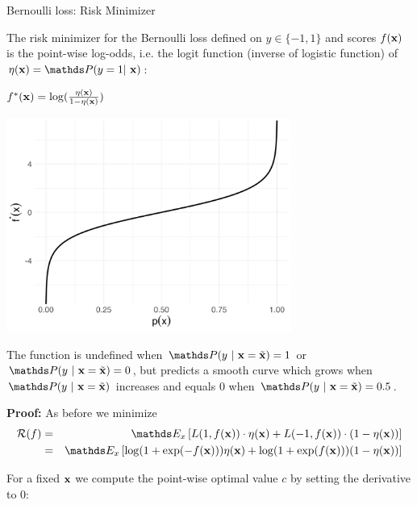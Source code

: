 \documentclass[11pt,compress,t,notes=noshow, xcolor=table]{beamer}
\begin{document}
\begin{vbframe}{Bernoulli loss: Risk Minimizer}
\begin{footnotesize}
\end{footnotesize}

\framebreak 

The risk minimizer for the Bernoulli loss defined on $y \in \{-1, 1\}$ and scores $f(\mathbf{x})$ is the point-wise log-odds, i.e. the logit function (inverse of logistic function) of $\eta(\xv) = \P(y=1|~\xv)$:

\begin{minipage}{0.3\textwidth} 
	\centering
	{$f^{\ast}(\mathbf{x}) =  \log (\frac{\eta(\mathbf{x}) }{1-\eta(\mathbf{x}) })$}
\end{minipage}
\hspace{-.03\textwidth}
\begin{minipage}{0.7\textwidth}
	\centering	
	\includegraphics[width=0.7\textwidth]{figure/logistic_inverse.png}
\end{minipage}

The function is undefined when $\P(y~|~\xv = \xtil) = 1$ or $\P(y~|~\xv = \xtil) = 0$, but predicts a smooth curve which grows when $\P(y~|~\xv = \xtil)$ increases and equals $0$ when $\P(y~|~\xv = \xtil) = 0.5$.

\framebreak 

\textbf{Proof: } As before we minimize 
\begin{eqnarray*}
  \riskf &=& \E_x \left[L(1, \fx) \cdot \eta(\xv) + L(-1, \fx) \cdot (1 - \eta(\xv)) \right] \\
  &=& \E_x \left[ \log(1 + \exp(- \fx)) \eta(\xv)+ \log(1 + \exp(\fx)) (1 - \eta(\xv)) \right] 
\end{eqnarray*}

For a fixed $\mathbf{x}$ we compute the point-wise optimal value $c$ by setting the derivative to $0$: 


\end{vbframe}
\end{document}
